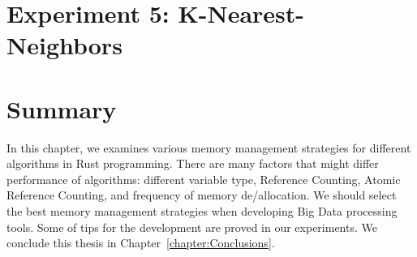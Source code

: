 \section{Experiment 5: K-Nearest-Neighbors}
\label{sec:eval_knn}


\section{Summary}
\label{sec:eval_summary}
In this chapter, we examines various memory management strategies for different algorithms in Rust programming.
There are many factors that might differ performance of algorithms: different variable type, Reference Counting, Atomic Reference Counting, and frequency of memory de/allocation.
We should select the best memory management strategies when developing Big Data processing tools. 
Some of tips for the development are proved in our experiments. We conclude this thesis in Chapter~\ref{chapter:Conclusions}.

% 
